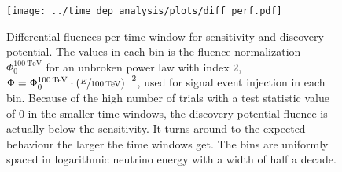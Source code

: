 \begin{figure}[htbp]
  \centering
  \texttt{[image: ../time\_dep\_analysis/plots/diff\_perf.pdf]}
  \caption[Time-dependent differential performances]{
    Differential fluences per time window for sensitivity and discovery potential.
    The values in each bin is the fluence normalization $\Phi_0^{\SI{100}{\TeV}}$ for an unbroken power law with index $2$, $\Phi = \Phi_0^{\SI{100}{\TeV}}\cdot \left(\sfrac{E}{\SI{100}{\TeV}}\right)^{-2}$, used for signal event injection in each bin.
    Because of the high number of trials with a test statistic value of $0$ in the smaller time windows, the discovery potential fluence is actually below the sensitivity.
    It turns around to the expected behaviour the larger the time windows get.
    The bins are uniformly spaced in logarithmic neutrino energy with a width of half a decade.
  }
  \label{fig:tdep_diff_perf}
\end{figure}

